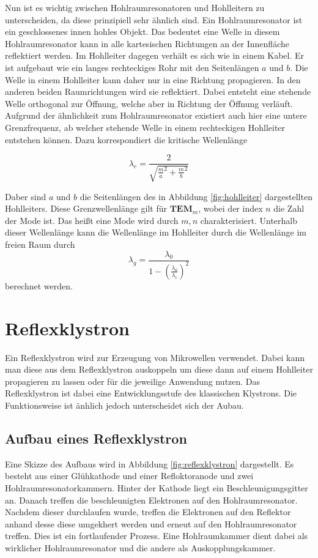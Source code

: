Nun ist es wichtig zwischen Hohlraumresonatoren und Hohlleitern zu unterscheiden, da diese 
prinzipiell sehr ähnlich sind. Ein Hohlraumresonator ist ein geschlossenes innen hohles Objekt. Das bedeutet eine Welle in diesem Hohlraumresonator kann in alle kartesischen Richtungen
an der Innenfläche reflektiert werden. Im Hohlleiter dagegen verhält es sich wie in einem Kabel. Er ist aufgebaut wie ein langes rechteckiges Rohr mit den Seitenlängen $a$ und $b$. Die 
Welle in einem Hohlleiter kann daher nur in eine Richtung propagieren. In den anderen beiden Raumrichtungen wird sie reflektiert. Dabei entsteht eine stehende Welle orthogonal zur 
Öffnung, welche aber in Richtung der Öffnung verläuft. Aufgrund der ähnlichkeit zum Hohlraumresonator existiert auch hier eine untere Grenzfrequenz, ab welcher stehende Welle 
in einem rechteckigen Hohlleiter entstehen können. Dazu korrespondiert die kritische Wellenlänge 

\begin{equation}
              \label{eqn:lambda_c}
              \lambda_c = \frac{2}{\sqrt{\frac{m}{a}^2+\frac{m}{b}^2}}
\end{equation}

Daber sind $a$ und $b$ die Seitenlängen des in Abbildung \ref{fig:hohlleiter} dargestellten Hohlleiters. Diese Grenzwellenlänge gilt für $\textbf{TEM}_m$, wobei der index $n$ die Zahl 
der Mode ist. Das heißt eine Mode wird durch $m,n$ charakterisiert. Unterhalb dieser Wellenlänge kann die Wellenlänge im Hohlleiter durch die Wellenlänge im freien Raum durch 
\begin{equation}
              \label{eqn:lambda_g}
              \lambda_g = \frac{\lambda_0}{1-\left(\frac{\lambda_0}{\lambda_c}\right)^2}
\end{equation}
berechnet werden.

\section{Reflexklystron}
\label{sec:reflexklystron}
Ein Reflexklystron wird zur Erzeugung von Mikrowellen verwendet. Dabei kann man diese aus dem Reflexklystron auskoppeln um diese dann auf einem Hohlleiter propagieren zu lassen oder 
für die jeweilige Anwendung nutzen. Das Reflexklystron ist dabei eine Entwicklungsstufe des klassischen Klystrons. Die Funktionsweise ist änhlich jedoch unterscheidet sich der Aubau.
\subsection{Aufbau eines Reflexklystron}
\label{subsec:aufbau_klystron}
Eine Skizze des Aufbaus wird in Abbildung \ref{fig:reflexklystron} dargestellt. Es besteht aus einer Glühkathode und einer Refloktoranode und zwei Hohlraumresonatorkammern. Hinter 
der Kathode liegt ein Beschleunigungsgitter an. Danach treffen die beschleunigten Elektronen auf den Hohlraumresonator. Nachdem dieser durchlaufen wurde, treffen die Elektronen auf 
den Reflektor anhand desse diese umgekhert werden und erneut auf den Hohlraumresonator treffen. Dies ist ein fortlaufender Prozess. Eine Hohlraumkammer dient dabei als wirklicher 
Hohlraumresonator und die andere als Auskopplungskammer.

